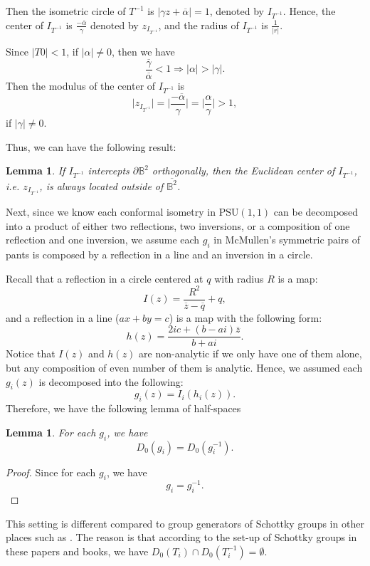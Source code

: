 \documentclass[12pt,oneside]{sfsuthesis}
\theoremstyle{plain} %
\newtheorem{lemma}[theorem]{Lemma}
\theoremstyle{definition}  %
\theoremstyle{remark}  %
\theoremstyle{plain}
\begin{document}
{Then the isometric circle of $T^{-1}$ is $\vert \gamma z + \overline{\alpha}\vert=1$, denoted by $I_{T^{-1}}$. Hence, the center of $I_{T^{-1}}$ is $\frac{-\overline{\alpha}}{\gamma}$ denoted by $z_{I_{T^{-1}}}$, and the radius of $I_{T^{-1}}$ is $\frac{1}{\vert r\vert}$.

Since $\vert T0\vert<1$, if $\vert \alpha \vert\neq 0$, then we have 
$$
\frac{\overline{\gamma}}{\overline{\alpha}}<1 \Rightarrow \vert \alpha \vert>\vert \gamma\vert.
$$
Then the modulus of the center of $I_{T^{-1}}$ is 
$$
\vert z_{I_{T^{-1}}}\vert = \bigg| \frac{-\overline{\alpha}}{\gamma} \bigg| =\bigg| \frac{\alpha}{\gamma} \bigg| >1,
$$
if $\vert \gamma \vert \neq 0$.

Thus, we can have the following result:
\begin{lemma}
If $I_{T^{-1}}$ intercepts $\partial\mathbb{B}^2$ orthogonally, then the Euclidean center of $I_{T^{-1}}$, i.e. $z_{I_{T^{-1}}}$, is always located outside of $\overline{\mathbb{B}^2}$.
\end{lemma}

Next, since we know each conformal isometry in $\text{PSU}(1,1)$ can be decomposed into a product of either two reflections, two inversions, or a composition of one reflection and one inversion, we assume each $g_i$ in McMullen's symmetric pairs of pants is composed by a reflection in a line and an inversion in a circle. 

Recall that a reflection in a circle centered at $q$ with radius $R$ is a map:
$$
I(z)=\frac{R^2}{\overline{z}-\overline{q}}+q,
$$
and a reflection in a line ($ax+by=c$) is a map with the following form:
$$
h(z)=\frac{2 i c+(b-ai)\overline{z}}{b+ai}.
$$
Notice that $I(z)$ and $h(z)$ are non-analytic if we only have one of them alone, but any composition of even number of them is analytic. Hence, we assumed each $g_i(z)$ is decomposed into the following:
$$
g_i(z)=I_i(h_i(z)).
$$
Therefore, we have the following lemma of half-spaces
\begin{lemma}
For each $g_i$, we have
$$
D_0(g_i)= D_0(g_i^{-1}).
$$
\end{lemma}
\begin{proof}
Since for each $g_i$, we have
$$
g_i=g_i^{-1}.
$$
\end{proof}

This setting is different compared to group generators of Schottky groups in other places such as \cite{borthwick2007spectral, dal2010geodesic, bourgain2017fourier, bourgain2018spectral}. The reason is that according to the set-up of Schottky groups in these papers and books, we have $D_0(T_i)\cap D_0(T_i^{-1})=\emptyset$.

}
\end{document}
